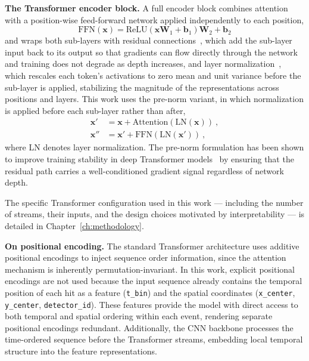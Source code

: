 \textbf{The Transformer encoder block.} A full encoder block combines attention with a position-wise feed-forward network applied independently to each position,
\begin{equation}
    \text{FFN}(\textbf{x}) = \text{ReLU}(\textbf{xW}_1 + \textbf{b}_1)\textbf{W}_2 + \textbf{b}_2
\end{equation}
and wraps both sub-layers with residual connections~, which add the sub-layer input back to its output so that gradients can flow directly through the network and training does not degrade as depth increases, and layer normalization~, which rescales each token's activations to zero mean and unit variance before the sub-layer is applied, stabilizing the magnitude of the representations across positions and layers. This work uses the pre-norm variant, in which normalization is applied before each sub-layer rather than after,
\begin{align*}
    \textbf{x}' &= \textbf{x} + \text{Attention}(\text{LN}(\textbf{x})) \ , \\
    \textbf{x}'' &= \textbf{x}' + \text{FFN}(\text{LN}(\textbf{x}')) \ ,
\end{align*}
where LN denotes layer normalization. The pre-norm formulation has been shown to improve training stability in deep Transformer models~ by ensuring that the residual path carries a well-conditioned gradient signal regardless of network depth.

The specific Transformer configuration used in this work --- including the number of streams, their inputs, and the design choices motivated by interpretability --- is detailed in Chapter~\ref{ch:methodology}.

\textbf{On positional encoding.} The standard Transformer architecture uses additive positional encodings to inject sequence order information, since the attention mechanism is inherently permutation-invariant. In this work, explicit positional encodings are not used because the input sequence already contains the temporal position of each hit as a feature (\texttt{t\_bin}) and the spatial coordinates (\texttt{x\_center}, \texttt{y\_center}, \texttt{detector\_id}). These features provide the model with direct access to both temporal and spatial ordering within each event, rendering separate positional encodings redundant. Additionally, the CNN backbone processes the time-ordered sequence before the Transformer streams, embedding local temporal structure into the feature representations.

